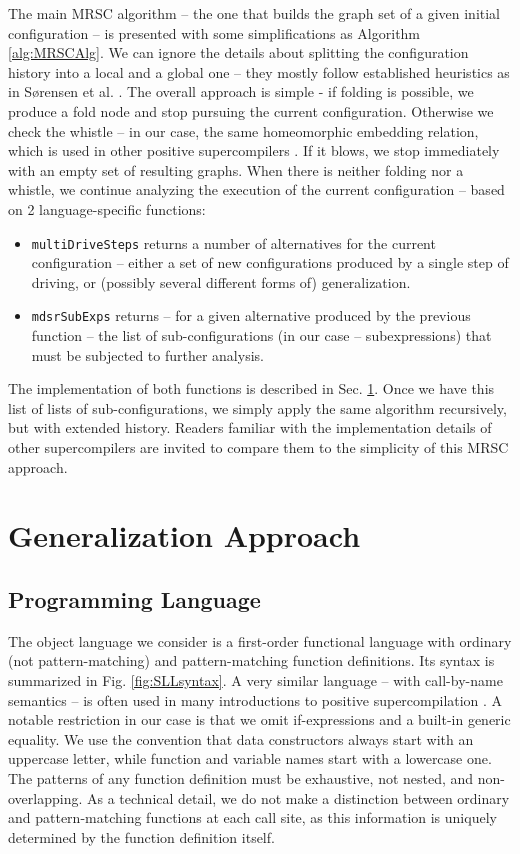 \documentclass[submission,copyright,creativecommons]{eptcs}
\begin{document}
The main MRSC algorithm -- the one that builds the graph set of a given initial
configuration -- is presented with some simplifications as Algorithm \ref{alg:MRSCAlg}.
We can ignore the details about splitting the configuration history into a local
and a global one -- they mostly follow established heuristics as in S{\o}rensen et al. 
\cite{Sorensen1994TurchinSupercompiler,sorm98b}.
The overall approach is simple - if folding is possible, we produce a fold node 
and stop pursuing the current configuration.
Otherwise we check the whistle -- in our case, the same homeomorphic embedding relation,
which is used in other positive supercompilers \cite{sorm98b}.
If it blows, we stop immediately with an empty set of resulting graphs.
When there is neither folding nor a whistle, we continue analyzing the execution of the
current configuration -- based on 2 language-specific functions:
\begin{itemize}
  \item \verb|multiDriveSteps| returns a number of alternatives for the current configuration --
    either a set of new configurations produced by a single step of driving, 
    or (possibly several different forms of) generalization.
  \item \verb|mdsrSubExps| returns -- for a given alternative produced by the previous function --
    the list of sub-configurations (in our case -- subexpressions) that must be subjected
    to further analysis.
\end{itemize}
The implementation of both functions is described in Sec. \ref{sec:Generalize}.
Once we have this list of lists of sub-configurations, we simply apply the same
algorithm recursively, but with extended history.
Readers familiar with the implementation details of other supercompilers are
invited to compare them to the simplicity of this MRSC approach.

\section{Generalization Approach}\label{sec:Generalize}

\subsection{Programming Language}

The object language we consider is a first-order functional language with ordinary (not pattern-matching) and 
pattern-matching function definitions.
Its syntax is summarized in Fig. \ref{fig:SLLsyntax}.
A very similar language -- with call-by-name semantics -- is often used in many introductions to positive
supercompilation \cite{Sorensen1994TurchinSupercompiler,sorm98b,TMR/SCP2014}.
A notable restriction in our case is that we omit if-expressions and a built-in generic equality.
We use the convention that data constructors always start with an uppercase letter, while
function and variable names start with a lowercase one.
The patterns of any function definition must be exhaustive, not nested, and non-overlapping.
As a technical detail, we do not make a distinction between ordinary and pattern-matching functions
at each call site, as this information is uniquely determined by the function definition itself.
\end{document}

